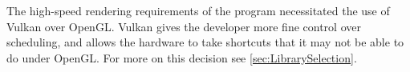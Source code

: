 The high-speed rendering requirements of the program necessitated the use of Vulkan over OpenGL.
Vulkan gives the developer more fine control over scheduling, and allows the hardware to take shortcuts that it may not be able to do under OpenGL.
For more on this decision see \cref{sec:LibrarySelection}.